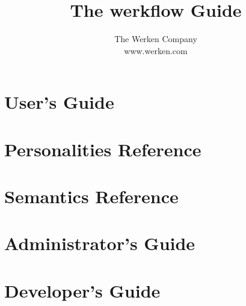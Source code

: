 \documentclass[10pt,letterpaper]{book}
\begin{document}
\let\footnoterule\hrule

\makeatletter
\renewcommand{\@makefntext}[1]%
        {\noindent\makebox[1.8em][r]{\@makefnmark}#1}
\makeatother

\title{The \textsf{werkflow} Guide}

\author{\textsf{The Werken Company}\\
        \textsf{www.werken.com}}


\frontmatter

\maketitle

\tableofcontents

\mainmatter

\part{User's Guide}





\part{Personalities Reference}





\part{Semantics Reference}






\part{Administrator's Guide}




\part{Developer's Guide}





\end{document}
